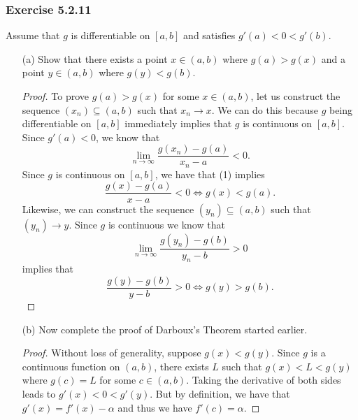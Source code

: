 \subsubsection{Exercise 5.2.11} Assume that \( g  \) is differentiable on \( [a,b] \) and satisfies \( g'(a) < 0 < g'(b)  \).
\begin{enumerate}
    \item[(a)] Show that there exists a point \( x \in (a,b)  \) where \( g(a) > g(x)  \) and a point \( y \in (a,b)  \) where \( g(y) < g(b) \).
        \begin{proof}
            To prove \( g(a) > g(x)  \) for some \( x \in (a,b)  \), let us construct the sequence \( (x_n) \subseteq (a,b)  \) such that \( x_n \to x \). We can do this because \( g  \) being differentiable on \( [a,b]  \) immediately implies that \( g  \) is continuous on \( [a,b]  \). Since \( g'(a) < 0   \), we know that 
            \[  \lim_{ n \to \infty  } \frac{ g(x_n) - g(a)  }{ x_n - a  } < 0  \tag{1}. \]
            Since \( g  \) is continuous on \( [a,b] \), we have that (1) implies
            \[ \frac{ g(x) - g(a)  }{ x - a  } < 0 \iff g(x) < g(a).     \]
            Likewise, we can construct the sequence \( (y_n) \subseteq (a,b)  \) such that \( (y_n) \to y  \). Since \( g  \) is continuous we know that 
            \[  \lim_{ n \to \infty  } \frac{ g(y_n) - g(b) }{ y_n - b  } > 0  \]
            implies that 
            \[  \frac{ g(y) - g(b)  }{ y - b } > 0 \iff g(y) > g(b). \]
        \end{proof}
    \item[(b)] Now complete the proof of  Darboux's Theorem started earlier.
        \begin{proof}
        Without loss of generality, suppose \( g(x) < g(y)  \). Since \( g  \) is a continuous function on \( (a,b)  \), there exists \( L  \) such that \( g(x) < L < g(y)  \) where \( g(c) = L  \) for some \( c \in (a,b)  \). Taking the derivative of both sides leads to \( g'(x) < 0 < g'(y)  \). But by definition, we have that \( g'(x) = f'(x) - \alpha    \) and thus we have \( f'(c) = \alpha \).
        \end{proof}
\end{enumerate}

